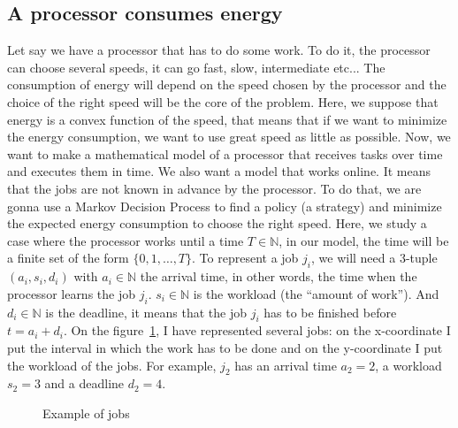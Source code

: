 \documentclass[
10pt, %
a4paper, %
oneside, %
headinclude,footinclude, %
BCOR5mm, %
]{scrartcl}
\newcommand{\N}{\mathbb{N}}
\begin{document}
\subsection{A processor consumes energy}
Let say we have a processor that has to do some work. To do it,
the processor can choose several speeds, it can go fast, slow,
intermediate etc... The consumption of energy will depend on the speed
chosen by the processor and the choice of the right speed will be the
core of the problem.
Here, we suppose that energy is a convex function of
the speed, that means that if we want to minimize the energy
consumption, we want to use great speed as little as possible. Now, we
want to make a mathematical model of a processor that receives tasks
over time and executes them in time. We also want a model that works
online. It means that the jobs are not known in advance by the
processor. To do that, we are gonna use a Markov Decision Process to
find a policy (a strategy) and
minimize the expected energy consumption to choose the right
speed. Here, we study a case where the processor works until a time
$T\in\N$, in our model, the time will be a finite set of the form
$\{0,1,\dots,T\}$. To represent a job $j_i$, we will need a 3-tuple
$(a_i,s_i,d_i)$ with $a_i\in\N$ the arrival time, in other words, the
time when the processor learns the job $j_i$. $s_i\in\N$ is the
workload (the ``amount of work''). And $d_i\in\N$ is the deadline, it
means that the job $j_i$ has to be finished before $t=a_i+d_i$. On the
figure~\ref{fig:jobs}, I have represented several jobs: on the x-coordinate
I put the interval in which the work has to be done and on the
y-coordinate I put the workload of the jobs. For example, $j_2$ has an
arrival time $a_2=2$, a workload $s_2=3$ and a deadline $d_2=4$. 

\begin{figure}
  \centering
  \caption{Example of jobs}
  \label{fig:jobs}  
\end{figure}
\end{document}
